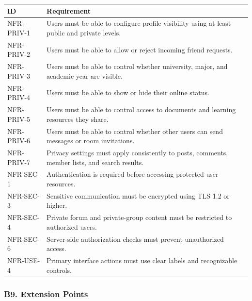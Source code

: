 \documentclass[12pt]{article}
\renewcommand{\baselinestretch}{1.5}
\begin{document}
\begingroup
\small
\renewcommand{\baselinestretch}{1.0}\selectfont
\renewcommand{\arraystretch}{1.15}
\setlength{\tabcolsep}{6pt}
\begin{longtable}{|>{\raggedright\arraybackslash}p{}|>{\raggedright\arraybackslash}p{}|}
\hline
\textbf{ID} & \textbf{Requirement} \\ \hline
\endhead
NFR-PRIV-1 & Users must be able to configure profile visibility using at least public and private levels. \\ \hline
NFR-PRIV-2 & Users must be able to allow or reject incoming friend requests. \\ \hline
NFR-PRIV-3 & Users must be able to control whether university, major, and academic year are visible. \\ \hline
NFR-PRIV-4 & Users must be able to show or hide their online status. \\ \hline
NFR-PRIV-5 & Users must be able to control access to documents and learning resources they share. \\ \hline
NFR-PRIV-6 & Users must be able to control whether other users can send messages or room invitations. \\ \hline
NFR-PRIV-7 & Privacy settings must apply consistently to posts, comments, member lists, and search results. \\ \hline
NFR-SEC-1 & Authentication is required before accessing protected user resources. \\ \hline
NFR-SEC-3 & Sensitive communication must be encrypted using TLS 1.2 or higher. \\ \hline
NFR-SEC-4 & Private forum and private-group content must be restricted to authorized users. \\ \hline
NFR-SEC-6 & Server-side authorization checks must prevent unauthorized access. \\ \hline
NFR-USE-4 & Primary interface actions must use clear labels and recognizable controls. \\ \hline
\end{longtable}
\endgroup
\par\medskip

\hypertarget{sec:b9-extension-points}{}
\subsubsection*{B9. Extension Points}
\par\medskip
\end{document}
